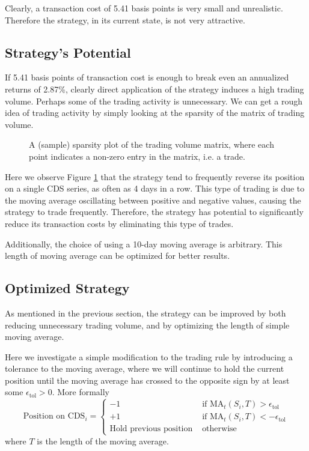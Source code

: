 \documentclass[11pt]{article}
\theoremstyle{definition}
\begin{document}
Clearly, a transaction cost of 5.41 basis points 
is very small and unrealistic.
Therefore the strategy, in its current state,
is not very attractive.

\subsection{Strategy's Potential}

If 5.41 basis points of transaction cost
is enough to break even an annualized returns of 2.87\%, 
clearly direct application of the strategy 
induces a high trading volume.
Perhaps some of the trading activity is unnecessary.
We can get a rough idea of trading activity 
by simply looking at the sparsity of 
the matrix of trading volume.

\begin{figure}[h!]
\begin{center}
\end{center}
\centering
\caption{\label{fg:spy_volume}
A (sample) sparsity plot of the trading volume matrix,
where each point indicates a non-zero entry
in the matrix, i.e. a trade.
}
\end{figure}

Here we observe Figure \ref{fg:spy_volume} 
that the strategy tend to 
frequently reverse its position on a single CDS series,
as often as 4 days in a row.
This type of trading is due to the moving average 
oscillating between positive and negative values, 
causing the strategy to trade frequently.
Therefore, the strategy has potential to 
significantly reduce its transaction costs
by eliminating this type of trades.

Additionally, the choice of
using a 10-day moving average is arbitrary.
This length of moving average 
can be optimized for better results.

\subsection{Optimized Strategy}

As mentioned in the previous section, 
the strategy can be improved by both reducing 
unnecessary trading volume, 
and by optimizing the length of simple moving average.

Here we investigate a simple modification to 
the trading rule by introducing a tolerance to 
the moving average,
where we will continue to hold the current position 
until the moving average has crossed to 
the opposite sign by at least some 
$\epsilon_\text{tol} > 0$.
More formally
%
\begin{equation*}
  \text{Position on CDS}_i =
  \begin{cases}
    -1 & \text{ if MA}_t(S_i,T) > \epsilon_\text{tol} \\
    +1 & \text{ if MA}_t(S_i,T) < -\epsilon_\text{tol} \\
    \text{Hold previous position} & \text{ otherwise}
  \end{cases}
\end{equation*}
%
where $T$ is the length of the moving average.
\end{document}
